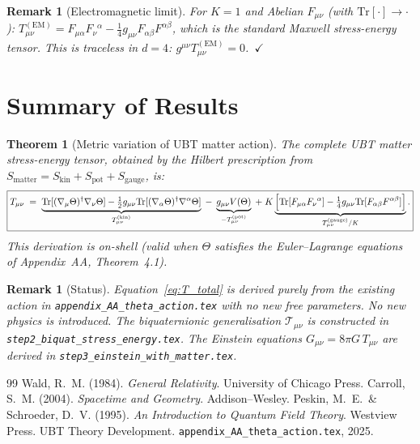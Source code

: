 \documentclass[12pt]{article}
\newtheorem{theorem}[definition]{Theorem}
\newtheorem{remark}[definition]{Remark}
\newcommand{\Tr}{\mathrm{Tr}}
\begin{document}
\begin{remark}[Electromagnetic limit]
  For $K=1$ and Abelian $F_{\mu\nu}$ (with $\Tr[\cdot]\to\cdot$):
  $T^{(\mathrm{EM})}_{\mu\nu} = F_{\mu\alpha}F_\nu{}^\alpha
  - \tfrac{1}{4}g_{\mu\nu}F_{\alpha\beta}F^{\alpha\beta}$,
  which is the standard Maxwell stress-energy tensor.
  This is traceless in $d=4$: $g^{\mu\nu}T^{(\mathrm{EM})}_{\mu\nu}=0$.~$\checkmark$
\end{remark}

\section{Summary of Results}
\label{sec:summary}

\begin{theorem}[Metric variation of UBT matter action]
\label{thm:T_matter}
The complete UBT matter stress-energy tensor, obtained by the Hilbert
prescription from $S_{\mathrm{matter}} = S_{\mathrm{kin}}
+ S_{\mathrm{pot}} + S_{\mathrm{gauge}}$, is:
\begin{equation}
  \label{eq:T_total}
  \boxed{
    T_{\mu\nu}
    \;=\;
    \underbrace{\Tr[(\nabla_\mu\Theta)^\dagger\nabla_\nu\Theta]
      -\tfrac{1}{2}g_{\mu\nu}\Tr[(\nabla_\alpha\Theta)^\dagger\nabla^\alpha\Theta]}_{%
      T^{(\mathrm{kin})}_{\mu\nu}}
    \;-\;
    \underbrace{g_{\mu\nu}V(\Theta)}_{%
      -T^{(\mathrm{pot})}_{\mu\nu}}
    \;+\;
    K\underbrace{\Bigl[\Tr[F_{\mu\alpha}F_\nu{}^\alpha]
      -\tfrac{1}{4}g_{\mu\nu}\Tr[F_{\alpha\beta}F^{\alpha\beta}]\Bigr]}_{%
      T^{(\mathrm{gauge})}_{\mu\nu}/K}.
  }
\end{equation}
This derivation is on-shell (valid when $\Theta$ satisfies the Euler--Lagrange
equations of Appendix~AA, Theorem~4.1).
\end{theorem}

\begin{remark}[Status]
  Equation~\eqref{eq:T_total} is derived purely from the existing action in
  \texttt{appendix\_AA\_theta\_action.tex} with no new free parameters.
  No new physics is introduced.
  The biquaternionic generalisation $\mathcal{T}_{\mu\nu}$ is constructed in
  \texttt{step2\_biquat\_stress\_energy.tex}.
  The Einstein equations $G_{\mu\nu} = 8\pi G\,T_{\mu\nu}$ are derived in
  \texttt{step3\_einstein\_with\_matter.tex}.
\end{remark}

\begin{thebibliography}{99}
    Wald, R.~M. (1984). \textit{General Relativity}.
                  University of Chicago Press.
 Carroll, S.~M. (2004). \textit{Spacetime and Geometry}.
                  Addison--Wesley.
      Peskin, M.~E.\ \& Schroeder, D.~V. (1995).
                  \textit{An Introduction to Quantum Field Theory}. Westview Press.
                  UBT Theory Development.
                  \texttt{appendix\_AA\_theta\_action.tex}, 2025.
\end{thebibliography}
\end{document}
